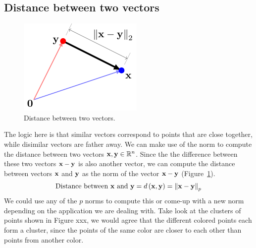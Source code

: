 \subsection{Distance between two vectors}
\begin{figure}
    \centering
    \includegraphics[width=0.95\linewidth]{figure/chapter01/dist-demo.pdf}
    \caption{Distance between two vectors.}
    \label{fig:distance1}
\end{figure}
The logic here is that similar vectors correspond to points that are close together, while disimilar vectors are father away. We can make use of the norm to compute the distance between two vectors $\mathbf{x}, \mathbf{y} \in \mathbb{R}^n$. Since the the difference between these two vectors $\mathbf{x} - \mathbf{y}$ is also another vector, we can compute the distance between vectors $\mathbf{x}$ and $\mathbf{y}$ as the norm of the vector $\mathbf{x} - \mathbf{y}$ (Figure~\ref{fig:distance1}).
\[ \text{Distance between } \mathbf{x} \text{ and } \mathbf{y} = d\left( \mathbf{x}, \mathbf{y}\right) = \left\lVert \mathbf{x} - \mathbf{y} \right\rVert_p \]
We could use any of the $p$ norms to compute this or come-up with a new norm depending on the application we are dealing with. Take look at the clusters of points shown in Figure xxx, we would agree that the different colored points each form a cluster, since the points of the same color are closer to each other than points from another color. 

